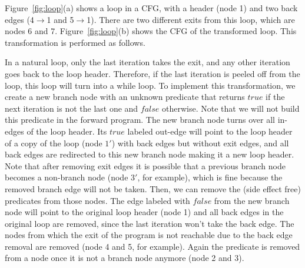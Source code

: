 Figure~\ref{fig:loop}(a) shows a loop in a CFG, with a header (node 1) and two back edges (4$\to$1 and 5$\to$1). 
There are two different exits from this loop, which are nodes 6 and 7.
Figure~\ref{fig:loop}(b) shows the CFG of the transformed loop.
This transformation is performed as follows.

In a natural loop, only the last iteration takes the exit, and any other iteration goes back to the loop header.
Therefore, if the last iteration is peeled off from the loop, this loop will turn into a while loop. 
To implement this transformation, we create a new branch node with an unknown predicate that returns $true$ if the next iteration is not the last one and $false$ otherwise.
Note that we will not build this predicate in the forward program. 
The new branch node turns over all in-edges of the loop header. 
Its $true$ labeled out-edge will point to the loop header of a copy of the loop (node $1'$) with back edges but without exit edges, and all back edges are redirected to this new branch node making it a new loop header. 
Note that after removing exit edges it is possible that a previous branch node becomes a non-branch node (node $3'$, for example), which is fine because the removed branch edge will not be taken. Then, we can remove the (side effect free) predicates from those nodes. The edge labeled with $false$ from the new branch node will point to the original loop header (node 1) and all back edges in the original loop are removed, since the last iteration won't take the back edge. The nodes from which the exit of the program is not reachable due to the back edge removal are removed (node 4 and 5, for example). Again the predicate is removed from a node once it is not a branch node anymore (node 2 and 3).


